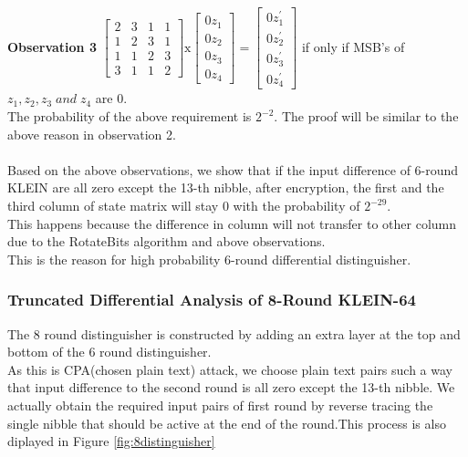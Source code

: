 \documentclass[preprint]{transcrypto}
\begin{document}
\\ \\
\textbf{Observation 3}
\begin{math}
\begin{bmatrix}
2&3&1&1\\
1&2&3&1\\
1&1&2&3\\
3&1&1&2
\end{bmatrix}
\text{x}
\begin{bmatrix}
0z_{1} \\
0z_{2} \\
0z_{3} \\
0z_{4} 
\end{bmatrix} = 
\begin{bmatrix}
0z^{'}_{1} \\
0z^{'}_{2} \\
0z^{'}_{3} \\
0z^{'}_{4} 
\end{bmatrix}
\end{math}
 if only if MSB's of $z_{1},
z_{2} ,
z_{3} \;and\;
z_{4} $ are 0.\\
The probability of the above requirement is $2^{-2}$. The proof will be similar to the above reason in observation 2.\\
\\Based on the above observations, we show that if the input difference of 6-round KLEIN are all zero except the 13-th nibble, after encryption, the first and the third column of state matrix will
stay 0 with the probability of $2^{-29}$.\\
This happens because the difference in column will not transfer to other column due to the RotateBits algorithm and above observations. \\ This is the reason for high probability 6-round differential distinguisher.

\subsubsection{Truncated Differential Analysis of 8-Round KLEIN-64}
The 8 round distinguisher is constructed by adding an extra layer at the top and bottom of the 6 round distinguisher.\\
As this is CPA(chosen plain text) attack, we choose plain text pairs such a way that input difference to the second round is all zero except the 13-th nibble. We actually obtain the required input pairs of first round by reverse tracing the single nibble that should be active at the end of the round.This process is also diplayed in Figure \ref{fig:8distinguisher} \\
\end{document}
